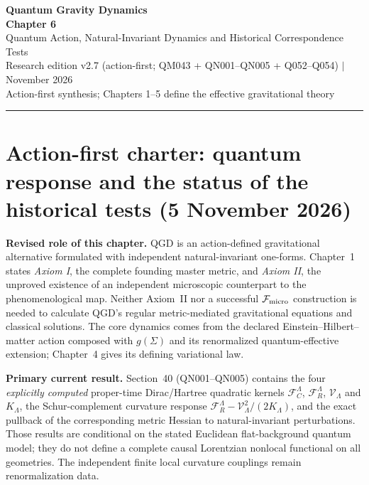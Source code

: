 \documentclass[11pt,a4paper]{article}
\begin{document}
\begin{center}
{\color{navy}\Large\bfseries Quantum Gravity Dynamics}\\[5pt]
{\LARGE\bfseries Chapter 6}\\[4pt]
{\large Quantum Action, Natural-Invariant Dynamics and Historical Correspondence Tests}\\[6pt]
{\small Research edition v2.7 (action-first; QM043 + QN001--QN005 + Q052--Q054) \quad $\mid$  November 2026}\\[3pt]
{\small Action-first synthesis; Chapters 1--5 define the effective gravitational theory}
\end{center}
\vspace{5pt}\hrule\vspace{8pt}
\section*{Action-first charter: quantum response and the status of the historical tests (5 November 2026)}
\noindent\textbf{Revised role of this chapter.} QGD is an action-defined gravitational alternative formulated with independent natural-invariant one-forms. Chapter~1 states \emph{Axiom I}, the complete founding master metric, and \emph{Axiom II}, the unproved existence of an independent microscopic counterpart to the phenomenological map. Neither Axiom~II nor a successful $\mathcal F_{\rm micro}$ construction is needed to calculate QGD's regular metric-mediated gravitational equations and classical solutions. The core dynamics comes from the declared Einstein--Hilbert--matter action composed with $g(\Sigma)$ and its renormalized quantum-effective extension; Chapter~4 gives its defining variational law.

\noindent\textbf{Primary current result.} Section~40 (QN001--QN005) contains the four \emph{explicitly computed} proper-time Dirac/Hartree quadratic kernels $\mathcal F_C^\Lambda$, $\mathcal F_R^\Lambda$, $\mathcal V_\Lambda$ and $K_\Lambda$, the Schur-complement curvature response $\mathcal F_R^\Lambda-\mathcal V_\Lambda^2/(2K_\Lambda)$, and the exact pullback of the corresponding metric Hessian to natural-invariant perturbations. Those results are conditional on the stated Euclidean flat-background quantum model; they do not define a complete causal Lorentzian nonlocal functional on all geometries. The independent finite local curvature couplings remain renormalization data.
\end{document}
